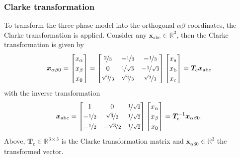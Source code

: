 \begin{frame}
	\frametitle{Clarke transformation}
	To transform the three-phase model into the orthogonal $\alpha\beta$ coordinates, the Clarke transformation is applied. Consider any $\bm{x}_\mathrm{abc}\in\mathbb{R}^3$, then the Clarke transformation is given by
	\begin{equation}
		\renewcommand{\arraystretch}{1.2}
		\bm{x}_{\alpha \beta0} = \begin{bmatrix} x_\alpha \\ x_\beta \\ x_0\end{bmatrix} = \begin{bmatrix}
			\nicefrac{2}{3}        & -\nicefrac{1}{3}       & -\nicefrac{1}{3}        \\
			0                      & \nicefrac{1}{\sqrt{3}} & -\nicefrac{1}{\sqrt{3}} \\
			\nicefrac{\sqrt{2}}{3} & \nicefrac{\sqrt{2}}{3} & \nicefrac{\sqrt{2}}{3}
		\end{bmatrix} \begin{bmatrix} x_\mathrm{a} \\ x_\mathrm{b} \\ x_\mathrm{c}\end{bmatrix} = \bm{T}_\mathrm{c} \bm{x}_\mathrm{abc}
		\label{eq:Clarke_transformation}
	\end{equation}
	\pause
	with the inverse transformation
	\begin{equation}
		\renewcommand{\arraystretch}{1.2}
		\bm{x}_\mathrm{abc}  = \begin{bmatrix}
			1                & 0                       & \nicefrac{1}{\sqrt{2}} \\
			-\nicefrac{1}{2} & \nicefrac{\sqrt{3}}{2}  & \nicefrac{1}{\sqrt{2}} \\
			-\nicefrac{1}{2} & -\nicefrac{\sqrt{3}}{2} & \nicefrac{1}{\sqrt{2}}
		\end{bmatrix} \begin{bmatrix} x_\alpha \\ x_\beta \\ x_0\end{bmatrix} = \bm{T}_\mathrm{c}^{-1} \bm{x}_{\alpha \beta 0}.
	\end{equation}
	\pause
	Above, $\bm{T}_\mathrm{c}\in\mathbb{R}^{3\times 3}$ is the Clarke transformation matrix and $\bm{x}_\mathrm{\alpha \beta0}\in\mathbb{R}^3$ the transformed vector.
\end{frame}

